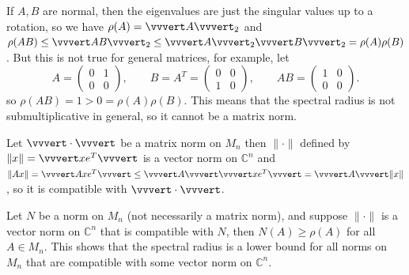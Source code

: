 \documentclass[../main.tex]{subfiles}
\begin{document}
\begin{remark}
  If $A,B$ are normal, then the eigenvalues are just the singular values up to a rotation, so we have $\rho(A) = \vvvert A \vvvert_2$ and $\rho(AB) \leq \vvvert AB \vvvert_2 \leq \vvvert A \vvvert_2 \vvvert B \vvvert_2 = \rho(A) \rho(B)$. But this is not true for general matrices, for example, let
  \begin{equation*}
    A = \begin{pmatrix}
      0 & 1 \\
      0 & 0
    \end{pmatrix}, \qquad B = A^T = \begin{pmatrix}
      0 & 0 \\
      1 & 0
    \end{pmatrix}, \qquad AB = \begin{pmatrix}
      1 & 0 \\
      0 & 0
    \end{pmatrix}.
  \end{equation*}
  so $\rho(AB) = 1 > 0 = \rho(A) \rho(B)$. This means that the spectral radius is not submultiplicative in general, so it cannot be a matrix norm.

  Let $\vvvert \cdot \vvvert$ be a matrix norm on $M_n$ then $\|\cdot\|$ defined by $\|x\| = \vvvert x e^T \vvvert$ is a vector norm on $\mathbb{C}^n$ and $\|Ax\| = \vvvert A x e^T \vvvert \leq \vvvert A \vvvert \vvvert x e^T \vvvert = \vvvert A \vvvert \|x\|$, so it is compatible with $\vvvert \cdot \vvvert$. 
\end{remark}

Let $N$ be a norm on $M_n$ (not necessarily a matrix norm), and suppose $\|\cdot\|$ is a vector norm on $\mathbb{C}^n$ that is compatible with $N$, then $N(A) \geq \rho(A)$ for all $A \in M_n$. This shows that the spectral radius is a lower bound for all norms on $M_n$ that are compatible with some vector norm on $\mathbb{C}^n$.
\end{document}
